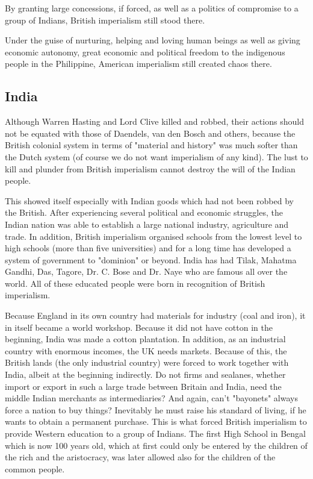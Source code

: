 By granting large concessions, if forced, as well as a politics of compromise to a group of Indians, British imperialism still stood there.\vskip 0.2in

Under the guise of nurturing, helping and loving human beings as well as giving economic 
autonomy, great economic and political freedom to the indigenous people in the Philippine, 
American imperialism still created chaos there.\vskip 0.2in

\subsection{India}

Although Warren Hasting and Lord Clive killed and robbed, 
their actions should not be equated with those of Daendels, van den 
Bosch and others, because the British colonial system in terms of 
"material and history" was much softer than the Dutch system (of course we do not want imperialism of any kind). 
The lust to kill and plunder from British imperialism cannot destroy the will of the Indian people.\vskip 0.2in

This showed itself especially with Indian goods which had not been robbed by the British. 
After experiencing several political and economic struggles, the Indian nation was able to 
establish a large national industry, agriculture and trade. In addition, British imperialism 
organised schools from the lowest level to high schools (more than five universities) 
and for a long time has developed a system of government to "dominion" or beyond. India 
has had Tilak, Mahatma Gandhi, Das, Tagore, Dr. C. Bose and Dr. Naye who are famous all 
over the world. All of these educated people were born in recognition of British imperialism.\vskip 0.2in

Because England in its own country had materials for industry (coal and iron), it in itself 
became a world workshop. Because it did not have cotton in the beginning, India was made a 
cotton plantation. In addition, as an industrial country with enormous incomes, the UK needs 
markets. Because of this, the British lands (the only industrial country) were forced to work 
together with India, albeit at the beginning indirectly. Do not firms and sealanes, whether 
import or export in such a large trade between Britain and India, need the middle Indian 
merchants as intermediaries? And again, can't "bayonets" always force a nation to buy things? 
Inevitably he must raise his standard of living, if he wants to obtain a permanent purchase. 
This is what forced British imperialism to provide Western education to a group of Indians. 
The first High School in Bengal which is now 100 years old, which at first could only be entered 
by the children of the rich and the aristocracy, was later allowed also for the children of the common people.\vskip 0.2in

